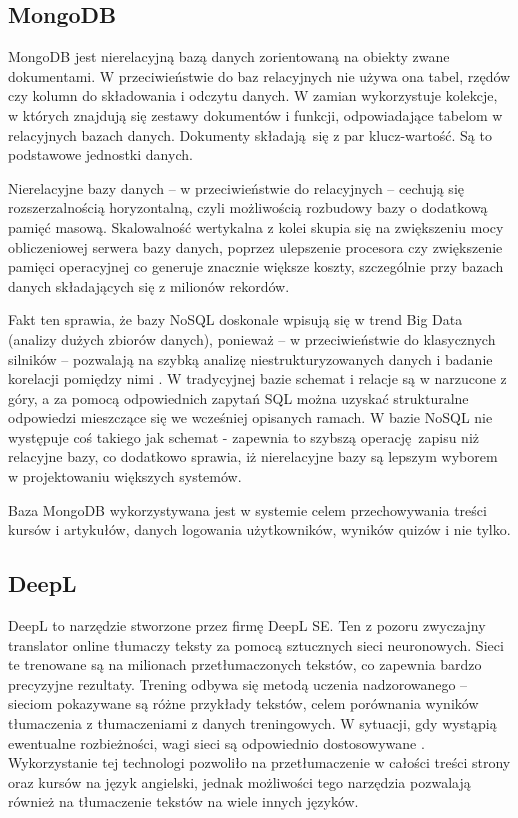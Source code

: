 \documentclass[12pt,twoside]{article}
\begin{document}
\subsection{MongoDB}

MongoDB jest nierelacyjną bazą danych zorientowaną na obiekty zwane dokumentami. W przeciwieństwie do baz relacyjnych nie używa ona tabel, rzędów czy kolumn do składowania i odczytu danych. W zamian wykorzystuje kolekcje, w których znajdują się zestawy dokumentów i funkcji, odpowiadające tabelom w relacyjnych bazach danych. Dokumenty składają się z par klucz-wartość. Są to podstawowe jednostki danych. 

Nierelacyjne bazy danych -- w przeciwieństwie do relacyjnych -- cechują się rozszerzalnością horyzontalną, czyli możliwością rozbudowy bazy o dodatkową pamięć masową. Skalowalność wertykalna z kolei skupia się na zwiększeniu mocy obliczeniowej serwera bazy danych, poprzez ulepszenie procesora czy zwiększenie pamięci operacyjnej co generuje znacznie większe koszty, szczególnie przy bazach danych składających się z milionów rekordów. 

Fakt ten sprawia, że bazy NoSQL doskonale wpisują się w trend Big Data (analizy dużych zbiorów danych), ponieważ – w przeciwieństwie do klasycznych silników – pozwalają na szybką analizę niestrukturyzowanych danych i badanie korelacji pomiędzy nimi \cite{BigData}. W tradycyjnej bazie schemat i relacje są w narzucone z góry, a za pomocą odpowiednich zapytań SQL można uzyskać strukturalne odpowiedzi mieszczące się we wcześniej opisanych ramach. W bazie NoSQL nie występuje coś takiego jak schemat - zapewnia to szybszą operację zapisu niż relacyjne bazy, co dodatkowo sprawia, iż nierelacyjne bazy są lepszym wyborem w projektowaniu większych systemów.
 
Baza MongoDB wykorzystywana jest w systemie celem przechowywania treści kursów i artykułów, danych logowania użytkowników, wyników quizów i nie tylko.

\subsection{DeepL}
DeepL to narzędzie stworzone przez firmę DeepL SE. Ten z pozoru zwyczajny translator online tłumaczy teksty za pomocą sztucznych sieci neuronowych. Sieci te trenowane są na milionach przetłumaczonych tekstów, co zapewnia bardzo precyzyjne rezultaty. Trening odbywa się metodą uczenia nadzorowanego -- sieciom pokazywane są różne przykłady tekstów, celem porównania wyników tłumaczenia z tłumaczeniami z danych treningowych. W sytuacji, gdy wystąpią ewentualne rozbieżności, wagi sieci są odpowiednio dostosowywane \cite{Deepl}. Wykorzystanie tej technologi pozwoliło na przetłumaczenie w całości treści strony oraz kursów na język angielski, jednak możliwości tego narzędzia pozwalają również na tłumaczenie tekstów na wiele innych języków. 
 
\end{document}
